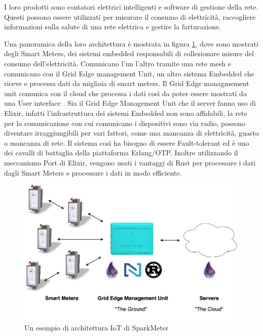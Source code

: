I loro prodotti sono contatori elettrici
intelligenti e software di gestione della rete.
Questi possono essere utilizzati per misurare
il consumo di elettricità, raccogliere informazioni
sulla salute di una rete elettrica e gestire
la fatturazione.

Una panoramica della loro architettura è mostrata
in figura \ref{fig:architettura_spark}, dove sono
mostrati degli Smart Meters, dei sistemi embedded
responsabili di collezionare misure del consumo
dell'elettricità. Comunicano l'un l'altro tramite
una rete mesh e comunicano con il Grid Edge
management Unit, un altro sistema Embedded che
riceve e processa dati da migliaia di smart meters.
Il Grid Edge managmement unit comunica con il cloud
che processa i dati così da poter essere mostrati
da una User interface \cite{Embedded35:online}.
Sia il Grid Edge Management Unit che il server
fanno uso di Elixir, infatti l'infrastruttura
dei sistemi Embedded non sono affidabili, 
la rete per la comunicazione con cui comunicano i
dispositivi sono via radio,
possono diventare irraggiungibili per vari fattori,
come una mancanza di elettricità, guasto o mancanza di rete.
Il sistema così ha bisogno di essere Fault-tolerant ed è
uno dei cavalli di battaglia della piattaforma Erlang/OTP.
Inoltre utilizzando il meccanismo Port di Elixir,
vengono usati i vantaggi di Rust per processare
i dati dagli Smart Meters e processare i dati
in modo efficiente.

\begin{figure}[!htp]
    \centering
    \includegraphics[keepaspectratio=true,scale=0.33]{images/sparkmeter-new-architecture.png}
	\caption{Un esempio di architettura IoT di SparkMeter\cite{Embedded35:online}}
  	\label{fig:architettura_spark}
\end{figure}



